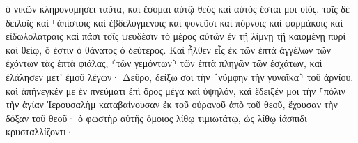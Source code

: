 \documentclass{openreader}
\begin{document}
ὁ νικῶν κληρονομήσει ταῦτα, καὶ ἔσομαι αὐτῷ θεὸς καὶ αὐτὸς ἔσται μοι υἱός. 
τοῖς δὲ δειλοῖς καὶ ⸀ἀπίστοις καὶ ἐβδελυγμένοις καὶ φονεῦσι καὶ πόρνοις καὶ φαρμάκοις καὶ εἰδωλολάτραις καὶ πᾶσι τοῖς ψευδέσιν τὸ μέρος αὐτῶν ἐν τῇ λίμνῃ τῇ καιομένῃ πυρὶ καὶ θείῳ, ὅ ἐστιν ὁ θάνατος ὁ δεύτερος. 
Καὶ ἦλθεν εἷς ἐκ τῶν ἑπτὰ ἀγγέλων τῶν ἐχόντων τὰς ἑπτὰ φιάλας, ⸂τῶν γεμόντων⸃ τῶν ἑπτὰ πληγῶν τῶν ἐσχάτων, καὶ ἐλάλησεν μετ’ ἐμοῦ λέγων· Δεῦρο, δείξω σοι τὴν ⸂νύμφην τὴν γυναῖκα⸃ τοῦ ἀρνίου. 
καὶ ἀπήνεγκέν με ἐν πνεύματι ἐπὶ ὄρος μέγα καὶ ὑψηλόν, καὶ ἔδειξέν μοι τὴν ⸀πόλιν τὴν ἁγίαν Ἰερουσαλὴμ καταβαίνουσαν ἐκ τοῦ οὐρανοῦ ἀπὸ τοῦ θεοῦ, 
ἔχουσαν τὴν δόξαν τοῦ θεοῦ· ὁ φωστὴρ αὐτῆς ὅμοιος λίθῳ τιμιωτάτῳ, ὡς λίθῳ ἰάσπιδι κρυσταλλίζοντι· 
\end{document}
